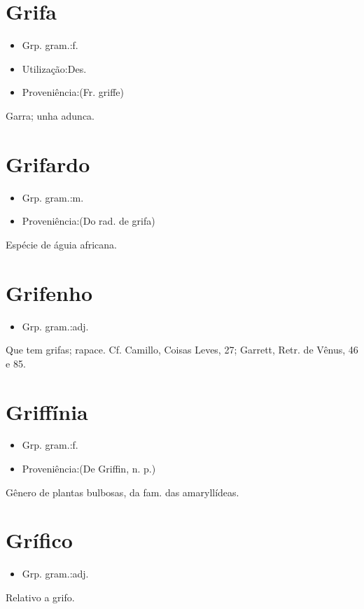 \section{Grifa}
\begin{itemize}
\item {Grp. gram.:f.}
\end{itemize}
\begin{itemize}
\item {Utilização:Des.}
\end{itemize}
\begin{itemize}
\item {Proveniência:(Fr. \textunderscore griffe\textunderscore )}
\end{itemize}
Garra; unha adunca.
\section{Grifardo}
\begin{itemize}
\item {Grp. gram.:m.}
\end{itemize}
\begin{itemize}
\item {Proveniência:(Do rad. de \textunderscore grifa\textunderscore )}
\end{itemize}
Espécie de águia africana.
\section{Grifenho}
\begin{itemize}
\item {Grp. gram.:adj.}
\end{itemize}
Que tem grifas; rapace. Cf. Camillo, \textunderscore Coisas Leves\textunderscore , 27; Garrett, \textunderscore Retr. de Vênus\textunderscore , 46 e 85.
\section{Griffínia}
\begin{itemize}
\item {Grp. gram.:f.}
\end{itemize}
\begin{itemize}
\item {Proveniência:(De \textunderscore Griffin\textunderscore , n. p.)}
\end{itemize}
Gênero de plantas bulbosas, da fam. das amaryllídeas.
\section{Grífico}
\begin{itemize}
\item {Grp. gram.:adj.}
\end{itemize}
Relativo a grifo.
